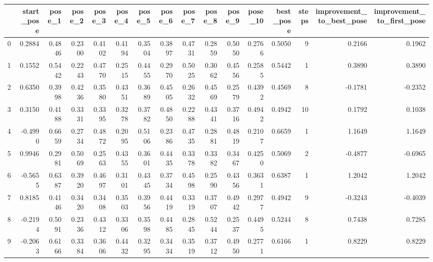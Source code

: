 \begin{tabular}{lrrrrrrrrrrrrrrr}
\toprule
{} &  start\_pose &  pose\_1 &  pose\_2 &  pose\_3 &  pose\_4 &  pose\_5 &  pose\_6 &  pose\_7 &  pose\_8 &  pose\_9 &  pose\_10 &  best\_pose &  steps &  improvement\_to\_best\_pose &  improvement\_to\_first\_pose \\
\midrule
0   &      0.2884 &  0.4846 &  0.2300 &  0.4102 &  0.4194 &  0.3504 &  0.3897 &  0.4731 &  0.2859 &  0.5050 &   0.2766 &     0.5050 &      9 &                    0.2166 &                     0.1962 \\
1   &      0.1552 &  0.5442 &  0.2243 &  0.4770 &  0.2515 &  0.4455 &  0.2970 &  0.5025 &  0.3062 &  0.4556 &   0.2585 &     0.5442 &      1 &                    0.3890 &                     0.3890 \\
2   &      0.6350 &  0.3998 &  0.4236 &  0.3580 &  0.4351 &  0.3689 &  0.4505 &  0.2632 &  0.4569 &  0.2579 &   0.4392 &     0.4569 &      8 &                   -0.1781 &                    -0.2352 \\
3   &      0.3150 &  0.4188 &  0.3331 &  0.3395 &  0.3278 &  0.3782 &  0.4850 &  0.2288 &  0.4341 &  0.3716 &   0.4942 &     0.4942 &     10 &                    0.1792 &                     0.1038 \\
4   &     -0.4990 &  0.6659 &  0.2734 &  0.4872 &  0.2095 &  0.5106 &  0.2386 &  0.4735 &  0.2881 &  0.4819 &   0.2107 &     0.6659 &      1 &                    1.1649 &                     1.1649 \\
5   &      0.9946 &  0.2981 &  0.5069 &  0.2563 &  0.4355 &  0.3601 &  0.4435 &  0.3378 &  0.3382 &  0.3467 &   0.4250 &     0.5069 &      2 &                   -0.4877 &                    -0.6965 \\
6   &     -0.5655 &  0.6387 &  0.3920 &  0.4697 &  0.3101 &  0.4345 &  0.3734 &  0.4598 &  0.2590 &  0.4356 &   0.3631 &     0.6387 &      1 &                    1.2042 &                     1.2042 \\
7   &      0.8185 &  0.4146 &  0.3420 &  0.3408 &  0.3503 &  0.3956 &  0.4419 &  0.3319 &  0.3707 &  0.4942 &   0.2977 &     0.4942 &      9 &                   -0.3243 &                    -0.4039 \\
8   &     -0.2194 &  0.5091 &  0.2336 &  0.4312 &  0.3306 &  0.3598 &  0.4485 &  0.2845 &  0.5244 &  0.2537 &   0.4495 &     0.5244 &      8 &                    0.7438 &                     0.7285 \\
9   &     -0.2063 &  0.6166 &  0.3384 &  0.3606 &  0.4432 &  0.3295 &  0.3434 &  0.3519 &  0.3712 &  0.4950 &   0.2771 &     0.6166 &      1 &                    0.8229 &                     0.8229 \\

\end{tabular}
